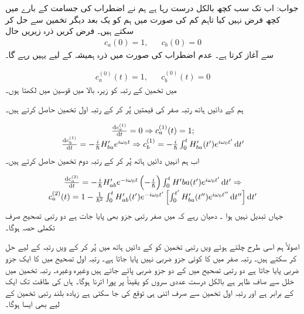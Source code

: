 جواب:  
اب تک سب کچھ بالکل درست رہا ہے ہم نے اضطراب کی جسامت کے بارے میں کچھ فرض نہیں کیا تاہم کم  کی صورت میں ہم  کو یک بعد دیگر تخمین سے حل کر سکتے ہیں۔ فرض کریں ذرہ زیریں حال
\begin{align}
	c_a(0)=1,&&c_b(0)=0
\end{align}
سے آغاز کرتا ہے۔ عدم  اضطراب کی صورت میں ذرہ ہمیشہ کے لیے یہیں رہے گا۔

\begin{align}
	c^{(0)}_a(t)=1,&&c_b^{(0)}(t)=0
\end{align}
میں تخمین کے رتبہ کو زیر، بالا میں قوسین میں لکھتا ہوں۔

ہم  کے دائیں ہاتھ رتبہ صفر کی قیمتیں پُر کر کے رتبہ اول تخمین حاصل کرتے ہیں۔

\begin{align}
	\begin{matrix}
		\frac{\dif c_a^{(1)}}{\dif t}=0\Rightarrow c_a^{(1)}(t)=1; \\
		\frac{\dif c_b^{(1)}}{\dif t}=-\frac{i}{\hslash}H'_{ba}e^{i\omega_0t}\Rightarrow c_b^{(1)}=-\frac{i}{\hslash}\int_{0}^{t}H'_{ba}(t')e^{i\omega_0t'}\dif t'
	\end{matrix} 
\end{align}
اب ہم انہیں دائیں ہاتھ پُر کر کے رتبہ دوم تخمین حاصل کرتے ہیں۔

\begin{align}
	\begin{matrix}
		\frac{\dif c_a^{(2)}}{\dif t}=-\frac{i}{\hslash}H'_{ab}e^{-i\omega_0t}\left(-\frac{i}{\hslash}\right)\int_{0}^{t}H'{ba}(t')e^{i\omega_0t'}\dif t'\Rightarrow \\
		c_a^{(2)}(t)=1-\frac{1}{\hslash^2}\int_{0}^{t}H'_{ab}(t')e^{-i\omega_0t'}\left[\int_{0}^{t'}H'_{ba}(t'')e^{i\omega_0t''}\dif t''\right]\dif t'
	\end{matrix}
\end{align}
جہاں  تبدیل نہیں ہوا ۔ دھیان رہے کہ  میں صفر رتبی جزو بھی پایا جات ہے دو رتبی تصحیح صرف تکملی حصہ ہوگا۔

اصولاً ہم اسی طرح چلتے ہوئے ویں رتبی تخمین کو  کے دائیں ہاتھ میں پُر کر کے ویں رتبہ کے لیے حل کر سکتے ہیں۔ رتبہ صفر میں  کا کوئی جزو ضربی نہیں پایا جاتا ہے۔ رتبہ اول تصحیح میں  کا ایک جزو ضربی پایا جاتا ہے دو رتبی تصحیح میں  کے دو جزو ضربی پائے جاتے ہیں وغیرہ وغیرہ۔ رتبہ تخمین میں خلل  سے صاف ظاہر ہے بالکل درست عددی سروں کو یقیناً  پر پورا اترنا ہوگا۔ ہاں  کی طاقت  تک  ایک کے برابر ہے اور رتبہ اول تخمین سے صرف اتنی ہی توقع کی جا سکتی ہے زیادہ بلند رتبی تخمین کے لیے بھی ایسا ہوگا۔

